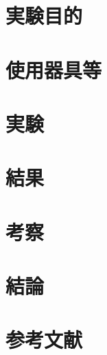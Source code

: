 \documentclass[10pt, a4paper]{jsarticle}
\begin{document}
\tableofcontents %
\newpage

\section{実験目的}


\section{使用器具等} 
\section{実験} 
\section{結果}
\section{考察}
\section{結論}
\section{参考文献}
\end{document}
